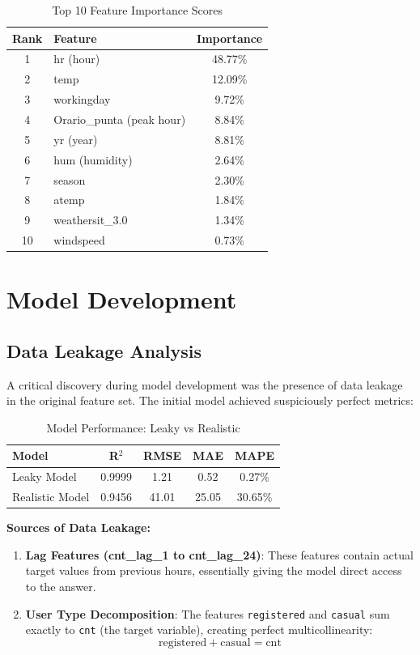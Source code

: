 \documentclass[12pt,a4paper]{article}
\begin{document}
\begin{table}[H]
\centering
\caption{Top 10 Feature Importance Scores}
\begin{tabular}{clc}
\toprule
\textbf{Rank} & \textbf{Feature} & \textbf{Importance} \\
\midrule
1 & hr (hour) & 48.77\% \\
2 & temp & 12.09\% \\
3 & workingday & 9.72\% \\
4 & Orario\_punta (peak hour) & 8.84\% \\
5 & yr (year) & 8.81\% \\
6 & hum (humidity) & 2.64\% \\
7 & season & 2.30\% \\
8 & atemp & 1.84\% \\
9 & weathersit\_3.0 & 1.34\% \\
10 & windspeed & 0.73\% \\
\bottomrule
\end{tabular}
\label{tab:importance}
\end{table}

\section{Model Development}

\subsection{Data Leakage Analysis}

A critical discovery during model development was the presence of data leakage in the original feature set. The initial model achieved suspiciously perfect metrics:

\begin{table}[H]
\centering
\caption{Model Performance: Leaky vs Realistic}
\begin{tabular}{lcccc}
\toprule
\textbf{Model} & \textbf{R$^2$} & \textbf{RMSE} & \textbf{MAE} & \textbf{MAPE} \\
\midrule
Leaky Model & 0.9999 & 1.21 & 0.52 & 0.27\% \\
Realistic Model & 0.9456 & 41.01 & 25.05 & 30.65\% \\
\bottomrule
\end{tabular}
\label{tab:models}
\end{table}

\textbf{Sources of Data Leakage:}

\begin{enumerate}
    \item \textbf{Lag Features (cnt\_lag\_1 to cnt\_lag\_24)}: These features contain actual target values from previous hours, essentially giving the model direct access to the answer.

    \item \textbf{User Type Decomposition}: The features \texttt{registered} and \texttt{casual} sum exactly to \texttt{cnt} (the target variable), creating perfect multicollinearity:
    \begin{equation}
    \text{registered} + \text{casual} = \text{cnt}
    \end{equation}
\end{enumerate}
\end{document}
